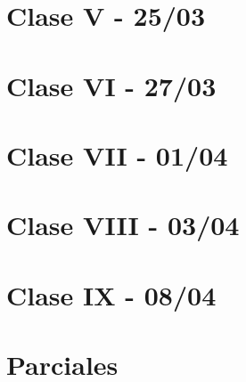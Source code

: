 \documentclass[12pt,a4paper]{book}
\begin{document}
\chapter{Clase V - 25/03 }


\chapter{Clase VI - 27/03 }


\chapter{Clase VII - 01/04 }


\chapter{Clase VIII - 03/04 }


\chapter{Clase IX - 08/04 }


\chapter{Parciales}


\blankpage



\nocite{*}
\end{document}
